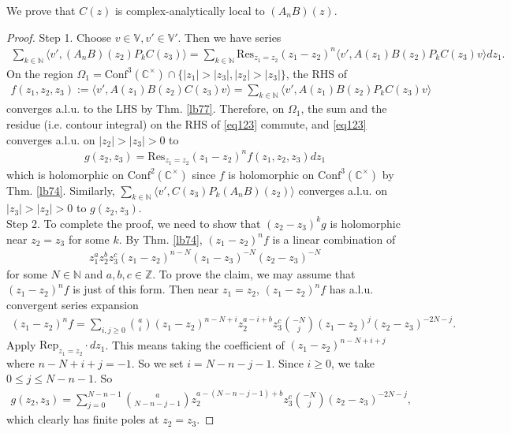 \documentclass[12pt,a4paper,notitlepage]{article}
\theoremstyle{definition}
\theoremstyle{plain}
\newcommand{\Conf}{\mathrm{Conf}}
\newcommand{\Res}{\mathrm{Res}}
\newcommand{\Rep}{\mathrm{Rep}}
\newcommand{\bk}[1]{\langle {#1}\rangle}
\newcommand{\Vbb}{\mathbb V}
\newcommand{\Cbb}{\mathbb C}
\newcommand{\Nbb}{\mathbb N}
\newcommand{\Zbb}{\mathbb Z}
\numberwithin{equation}{section}
\begin{document}
We prove that $C(z)$ is complex-analytically local to $(A_nB)(z)$. 
\begin{proof}
Step 1. Choose $v\in\Vbb,v'\in\Vbb'$. Then we have series
\begin{align}
\sum_{k\in\Nbb}\bk{v',(A_nB)(z_2)P_kC(z_3)}=\sum_{k\in\Nbb}\Res_{z_1=z_2}(z_1-z_2)^n\bk{v',A(z_1)B(z_2)P_kC(z_3)v}dz_1.\label{eq123}
\end{align}
On the region  $\Omega_1=\Conf^3(\Cbb^\times)\cap\{|z_1|>|z_3|,|z_2|>|z_3|\}$, the RHS of
\begin{align*}
f(z_1,z_2,z_3):=\bk{v',A(z_1)B(z_2)C(z_3)v}=\sum_{k\in\Nbb}\bk{v',A(z_1)B(z_2)P_kC(z_3)v}	
\end{align*}
converges a.l.u. to the LHS by Thm. \ref{lb77}. Therefore, on $\Omega_1$, the sum and the residue (i.e. contour integral) on the RHS of \eqref{eq123} commute, and \eqref{eq123} converges a.l.u. on $|z_2|>|z_3|>0$ to
\begin{align*}
g(z_2,z_3)=\Res_{z_1=z_2}(z_1-z_2)^nf(z_1,z_2,z_3)dz_1	
\end{align*}
which is holomorphic on $\Conf^2(\Cbb^\times)$ since $f$ is holomorphic on $\Conf^3(\Cbb^\times)$ by Thm. \ref{lb74}. Similarly,  $\sum_{k\in\Nbb}\bk{v',C(z_3)P_k(A_nB)(z_2)}$ converges a.l.u. on $|z_3|>|z_2|>0$ to $g(z_2,z_3)$.\\

Step 2. To complete the proof, we need to show that $(z_2-z_3)^kg$ is holomorphic near $z_2=z_3$ for some $k$. By Thm. \ref{lb74}, $(z_1-z_2)^nf$ is a linear combination of
\begin{align*}
z_1^az_2^bz_3^c(z_1-z_2)^{n-N}(z_1-z_3)^{-N}(z_2-z_3)^{-N}	
\end{align*}
for some $N\in\Nbb$ and $a,b,c\in\Zbb$. To prove the claim, we may assume that $(z_1-z_2)^nf$ is just of this form. Then near $z_1=z_2$, $(z_1-z_2)^nf$ has a.l.u. convergent series expansion
\begin{align*}
(z_1-z_2)^nf=\sum_{i,j\geq0}{a\choose i}(z_1-z_2)^{n-N+i}z_2^{a-i+b}z_3^c{-N\choose j}(z_1-z_2)^j(z_2-z_3)^{-2N-j}.	
\end{align*}
Apply $\Rep_{z_1=z_2}\cdot dz_1$. This means taking the coefficient of $(z_1-z_2)^{n-N+i+j}$ where $n-N+i+j=-1$. So we set $i=N-n-j-1$. Since $i\geq0$, we take $0\leq j\leq N-n-1$. So
\begin{align*}
g(z_2,z_3)=\sum_{j=0}^{N-n-1}	{a\choose N-n-j-1}z_2^{a-(N-n-j-1)+b}z_3^c{-N\choose j}(z_2-z_3)^{-2N-j},
\end{align*}
which clearly has finite poles at $z_2=z_3$.
\end{proof}
\end{document}

